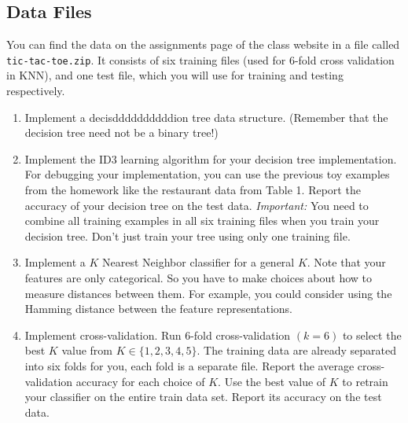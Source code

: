 \documentclass[listings, listings-bw, listings-color, listings-sv]{article}
\begin{document}
\subsection{Data Files}
\label{sec-3-2}

You can find the data on the assignments page of the class website in a file called \texttt{tic-tac-toe.zip}. It consists of six training files (used for 6-fold cross validation in KNN), and one test file, which you will use for training and testing respectively.

\begin{enumerate}
\item Implement a decisddddddddddion tree data structure. (Remember that the decision tree need not be a binary tree!)
\item Implement the ID3 learning algorithm for your decision tree implementation. For debugging your implementation, you can use the previous toy examples from the homework like the restaurant data from Table 1. Report the accuracy of your decision tree on the test data. \emph{Important:} You need to combine all training examples in all six training files when you train your decision tree. Don't just train your tree using only one training file.
\item Implement a $K$ Nearest Neighbor classifier for a general $K$. Note that your features are only categorical. So you have to make choices about how to measure distances between them. For example, you could consider using the Hamming distance between the feature representations.
\item Implement cross-validation. Run 6-fold cross-validation $(k=6)$ to select the best $K$ value from $K\in \{1,2,3,4,5\}$. The training data are already separated into six folds for you, each fold is a separate file. Report the average cross-validation accuracy for each choice of $K$. Use the best value of $K$ to retrain your classifier on the entire train data set. Report its accuracy on the test data.
\end{enumerate}
\end{document}

